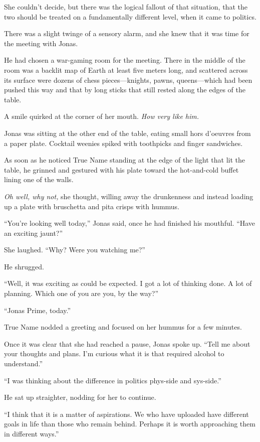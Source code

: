 She couldn't decide, but there was the logical fallout of that situation, that the two should be treated on a fundamentally different level, when it came to politics.

There was a slight twinge of a sensory alarm, and she knew that it was time for the meeting with Jonas.

He had chosen a war-gaming room for the meeting. There in the middle of the room was a backlit map of Earth at least five meters long, and scattered across its surface were dozens of chess pieces---knights, pawns, queens---which had been pushed this way and that by long sticks that still rested along the edges of the table.

A smile quirked at the corner of her mouth. \emph{How very like him.}

Jonas was sitting at the other end of the table, eating small hors d'oeuvres from a paper plate. Cocktail weenies spiked with toothpicks and finger sandwiches.

As soon as he noticed True Name standing at the edge of the light that lit the table, he grinned and gestured with his plate toward the hot-and-cold buffet lining one of the walls.

\emph{Oh well, why not,} she thought, willing away the drunkenness and instead loading up a plate with bruschetta and pita crisps with hummus.

``You're looking well today,'' Jonas said, once he had finished his mouthful. ``Have an exciting jaunt?''

She laughed. ``Why? Were you watching me?''

He shrugged.

``Well, it was exciting as could be expected. I got a lot of thinking done. A lot of planning. Which one of you are you, by the way?''

``Jonas Prime, today.''

True Name nodded a greeting and focused on her hummus for a few minutes.

Once it was clear that she had reached a pause, Jonas spoke up. ``Tell me about your thoughts and plans. I'm curious what it is that required alcohol to understand.''

``I was thinking about the difference in politics phys-side and sys-side.''

He sat up straighter, nodding for her to continue.

``I think that it is a matter of aspirations. We who have uploaded have different goals in life than those who remain behind. Perhaps it is worth approaching them in different ways.''

